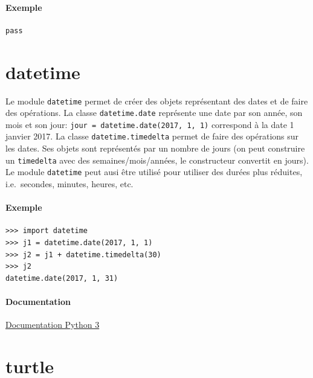 \documentclass[a4paper, 10pt]{article}
\begin{document}
\paragraph{Exemple}
\begin{verbatim}
pass
\end{verbatim}



\section{datetime}\label{datetime}

Le module \texttt{datetime} permet de créer des objets représentant des dates et de faire des opérations. La classe \texttt{datetime.date} représente une date par son année, son mois et son jour: \texttt{jour = datetime.date(2017, 1, 1)} correspond à la date 1\ier{} janvier 2017.
La classe \texttt{datetime.timedelta} permet de faire des opérations sur les dates. Ses objets sont représentés par un nombre de jours (on peut construire un \texttt{timedelta} avec des semaines/mois/années, le constructeur convertit en jours).
Le module \texttt{datetime} peut ausi être utilisé pour utiliser des durées plus réduites, i.e.\ secondes, minutes, heures, etc.

\paragraph{Exemple}
\begin{Verbatim}[frame=single, fontsize=\footnotesize]
>>> import datetime
>>> j1 = datetime.date(2017, 1, 1)
>>> j2 = j1 + datetime.timedelta(30)
>>> j2
datetime.date(2017, 1, 31)
\end{Verbatim}


\paragraph*{Documentation} \href{https://docs.python.org/fr/3/library/datetime.html}{Documentation Python 3}

\section{turtle}
\end{document}
